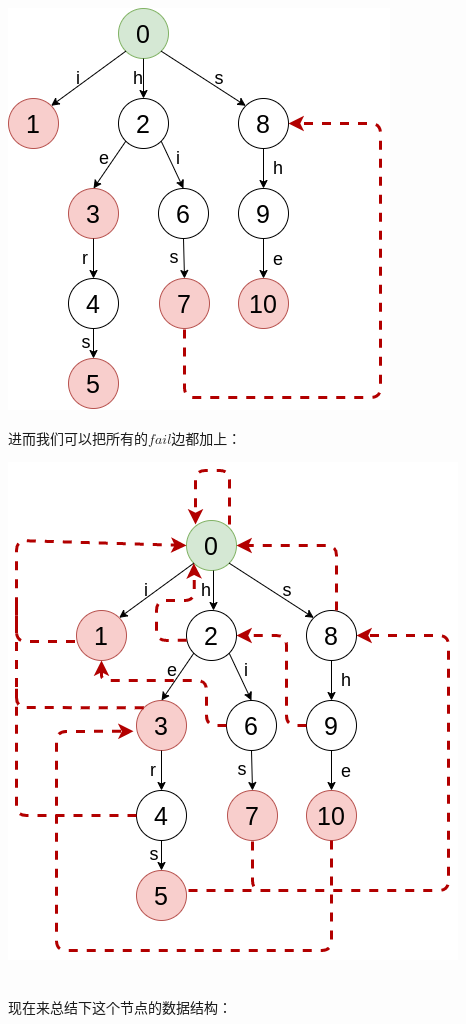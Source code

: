 \documentclass{article}
\begin{document}
\includegraphics[scale=0.35]{pic2.png} \par
进而我们可以把所有的$fail$边都加上：　\par
\includegraphics[scale=0.5]{pic3.png} \par
~\\
现在来总结下这个节点的数据结构：　\par
\end{document}
